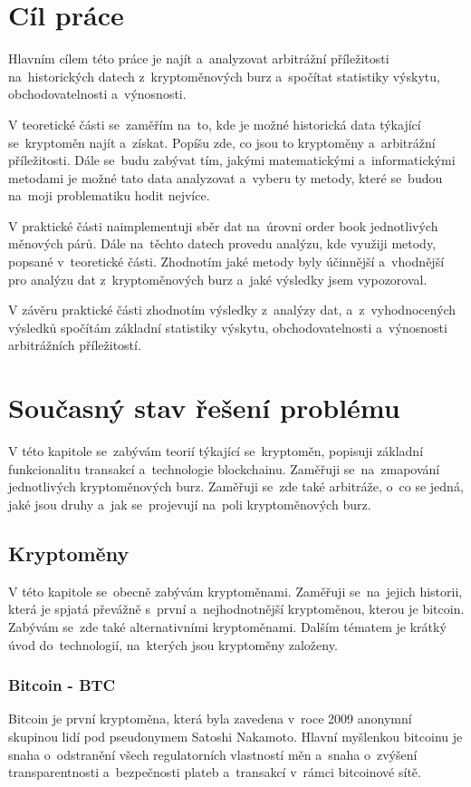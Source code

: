 \documentclass[thesis=B,czech]{FITthesis}[2019/03/21]
\begin{document}
\chapter{Cíl práce}
Hlavním cílem této práce je najít a~analyzovat arbitrážní příležitosti na~historických datech z~kryptoměnových burz a~spočítat statistiky výskytu, obchodovatelnosti a~výnosnosti. 

V teoretické části se~zaměřím na~to, kde je možné historická data týkající se~kryptoměn najít a~získat. Popíšu zde, co jsou to kryptoměny a~arbitrážní příležitosti. Dále se~budu zabývat tím, jakými matematickými a~informatickými metodami je možné tato data analyzovat a~vyberu ty metody, které se~budou na~moji problematiku hodit nejvíce.

V praktické části naimplementuji sběr dat na~úrovni order book jednotlivých měnových párů. Dále na~těchto datech provedu analýzu, kde využiji metody, popsané v~teoretické části. Zhodnotím jaké metody byly účinnější a~vhodnější pro analýzu dat z~kryptoměnových burz a~jaké výsledky jsem vypozoroval.

V závěru praktické části zhodnotím výsledky z~analýzy dat, a~z~vyhodnocených výsledků spočítám základní statistiky výskytu, obchodovatelnosti a~výnosnosti arbitrážních příležitostí. 

\chapter{Současný stav řešení problému}
V této kapitole se~zabývám teorií týkající se~kryptoměn, popisuji základní funkcionalitu transakcí a~technologie blockchainu. Zaměřuji se~na~zmapování jednotlivých kryptoměnových burz. Zaměřuji se~zde také arbitráže, o~co se \linebreak jedná, jaké jsou druhy a~jak se~projevují na~poli kryptoměnových burz.

\section{Kryptoměny}
V této kapitole se~obecně zabývám kryptoměnami. Zaměřuji se~na~jejich historii, která je spjatá převážně s~první a~nejhodnotnější kryptoměnou, kterou je bitcoin. Zabývám se~zde také alternativními kryptoměnami. Dalším tématem je krátký úvod do~technologií, na~kterých jsou kryptoměny založeny. \cite{BudoucnostFinTrhu}

\subsection{Bitcoin - BTC}
Bitcoin je první kryptoměna, která byla zavedena v~roce 2009 anonymní skupinou lidí pod pseudonymem Satoshi Nakamoto. Hlavní myšlenkou bitcoinu je snaha o~odstranění všech regulatorních vlastností měn a~snaha o~zvýšení transparentnosti a~bezpečnosti plateb a~transakcí v~rámci bitcoinové sítě. \cite{Finex}
\end{document}
